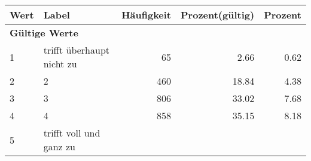      \begin{longtable}{lXrrr}
     \toprule
     \textbf{Wert} & \textbf{Label} & \textbf{Häufigkeit} & \textbf{Prozent(gültig)} & \textbf{Prozent} \\
     \endhead
     \midrule
     \multicolumn{5}{l}{\textbf{Gültige Werte}}\\

     1 &
     \multicolumn{1}{X}{ trifft überhaupt nicht zu   } &


       \num{65} &
       \num[round-mode=places,round-precision=2]{2.66} &
         \num[round-mode=places,round-precision=2]{0.62} \\

     2 &
     \multicolumn{1}{X}{ 2   } &


       \num{460} &
       \num[round-mode=places,round-precision=2]{18.84} &
         \num[round-mode=places,round-precision=2]{4.38} \\

     3 &
     \multicolumn{1}{X}{ 3   } &


       \num{806} &
       \num[round-mode=places,round-precision=2]{33.02} &
         \num[round-mode=places,round-precision=2]{7.68} \\

     4 &
     \multicolumn{1}{X}{ 4   } &


       \num{858} &
       \num[round-mode=places,round-precision=2]{35.15} &
         \num[round-mode=places,round-precision=2]{8.18} \\

     5 &
     \multicolumn{1}{X}{ trifft voll und ganz zu   } &



\end{longtable}
